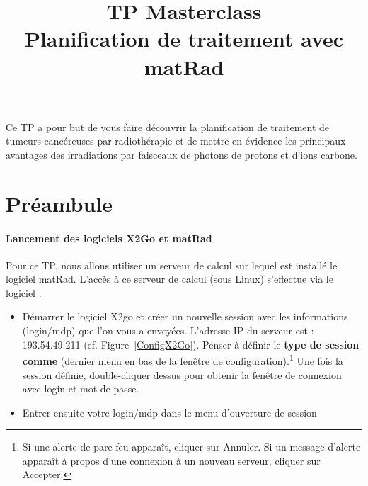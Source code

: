 \documentclass[a4paper,12pt,notitlepage]{article}	%
\date{}
\begin{document}
\title{TP Masterclass  \\ \small Planification de traitement avec matRad }
\date{}

\maketitle

Ce TP a pour but de vous faire découvrir la planification de traitement de tumeurs cancéreuses par radiothérapie et de mettre en évidence les principaux avantages des irradiations par faisceaux de photons de protons et d'ions carbone.

\section{Préambule}

\paragraph{Lancement des logiciels X2Go et matRad}

Pour ce TP, nous allons utiliser un serveur de calcul sur lequel est installé le logiciel matRad. L'accès à ce serveur de calcul (sous Linux) s'effectue via le logiciel . 

\begin{itemize}
	\item Démarrer le logiciel X2go et créer un nouvelle session avec les informations (login/mdp) que l'on vous a envoyées. L'adresse IP du serveur est : 193.54.49.211 (cf. Figure~\ref{ConfigX2Go}).	Penser à définir le \textbf{type de session comme } (dernier menu en bas de la fenêtre de configuration).\footnote{Si une alerte de pare-feu apparaît, cliquer sur Annuler. Si un message d'alerte apparaît à propos d'une connexion à un nouveau serveur, cliquer sur Accepter.} Une fois la session définie, double-cliquer dessus pour obtenir la fenêtre de connexion avec login et mot de passe.
	\item Entrer ensuite votre login/mdp dans le menu d'ouverture de session
\end{itemize}
\end{document}
